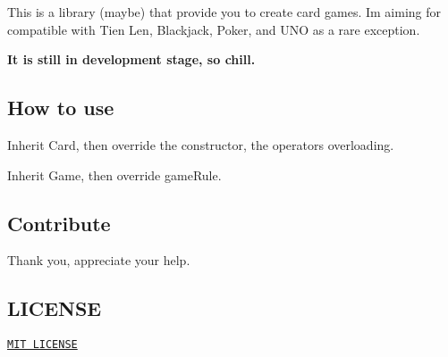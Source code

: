 This is a library (maybe) that provide you to create card games. I\textquotesingle{}m aiming for compatible with {\ttfamily Tien Len}, {\ttfamily Blackjack}, {\ttfamily Poker}, and {\ttfamily U\+NO} as a rare exception.

{\bfseries It is still in development stage, so chill.}

\subsection*{How to use}


\begin{DoxyItemize}
\item Inherit {\ttfamily Card}, then override the constructor, the operators overloading.
\item Inherit {\ttfamily Game}, then override {\ttfamily game\+Rule}.
\end{DoxyItemize}

\subsection*{Contribute}

Thank you, appreciate your help.

\subsection*{L\+I\+C\+E\+N\+SE}

\href{./LICENSE}{\tt M\+IT L\+I\+C\+E\+N\+SE} 